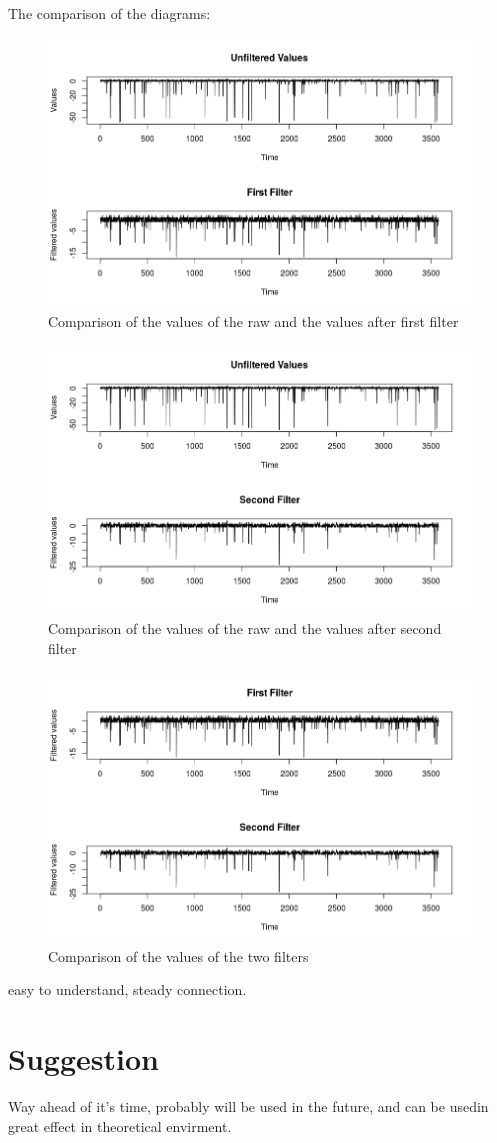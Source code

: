 The comparison of the diagrams:
\begin{figure}[h!]
	\centering
		\includegraphics[width=.9\linewidth]{figures/comp1.png}
		\caption{Comparison of the values of the raw and the values after first filter \cite{firstcomp}}\label{fig:firstComp}
\end{figure}

\begin{figure}[h!]
	\centering
		\includegraphics[width=.9\linewidth]{figures/comp2.png}
		\caption{Comparison of the values of the raw and the values after second filter \cite{secondcomp}}\label{fig:secondComp}
\end{figure}
\begin{figure}[h!]
	\centering
		\includegraphics[width=.9\linewidth]{figures/comp3.png}
		\caption{Comparison of the values of the two filters \cite{thirdcomp}}\label{fig:thirdComp}
\end{figure}


easy to understand, steady connection.
\section{Suggestion} 
Way ahead of it's time, probably will be used in the future, and can be usedin great effect in theoretical envirment. 
